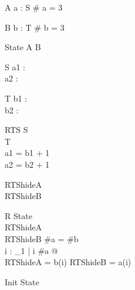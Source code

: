 \begin{schema}{A}
a : \seq S
\where
\# a = 3
\end{schema}

\begin{schema}{B}
b : \seq T
\where
\# b = 3
\end{schema}

\begin{zed}
State  A \land B
\end{zed}

\begin{schema}{S}
a1 : \nat\\
a2 : \nat
\end{schema}

\begin{schema}{T}
b1 : \nat\\
b2 : \nat
\end{schema}

\begin{schema}{RTS}
S\\
T\\
\where
a1 = b1 + 1\\
a2 = b2 + 1
\end{schema}

\begin{zed}
RTShideA \\
RTShideB 
\end{zed}

%
%
\begin{schema}{R}
State\\
RTShideA\\
RTShideB
\where
\#a = \#b\\
\forall i : \nat_1 | i \leq \#a @ \\
      \theta RTShideA = b(i) \land \theta RTShideB = a(i)
\end{schema}

\begin{schema}{Init}
State
\where
[S, T | R]
\end{schema}
